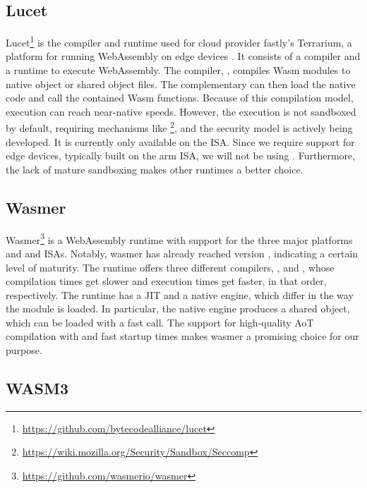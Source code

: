 \subsection{Lucet}

Lucet\footnote{\url{https://github.com/bytecodealliance/lucet}} is the compiler and runtime used for cloud provider fastly's Terrarium, a platform for running WebAssembly on edge devices \cite{fastly2019}. It consists of a compiler and a runtime to execute WebAssembly. The compiler, , compiles Wasm modules to native object or shared object files. The complementary  can then load the native code and call the contained Wasm functions. Because of this compilation model, execution can reach near-native speeds. However, the execution is not sandboxed by default, requiring mechanisms like \footnote{\url{https://wiki.mozilla.org/Security/Sandbox/Seccomp}}, and the security model is actively being developed. It is currently only available on the  ISA. Since we require support for edge devices, typically built on the arm ISA, we will not be using . Furthermore, the lack of mature sandboxing makes other runtimes a better choice.

\subsection{Wasmer}

Wasmer\footnote{\url{https://github.com/wasmerio/wasmer}} is a WebAssembly runtime with support for the three major platforms and  and  ISAs. Notably, wasmer has already reached version , indicating a certain level of maturity. The runtime offers three different compilers, ,  and , whose compilation times get slower and execution times get faster, in that order, respectively. The runtime has a JIT and a native engine, which differ in the way the module is loaded. In particular, the native engine produces a shared object, which can be loaded with a fast  call. The support for high-quality AoT compilation with  and fast startup times makes wasmer a promising choice for our purpose.

\subsection{WASM3}

